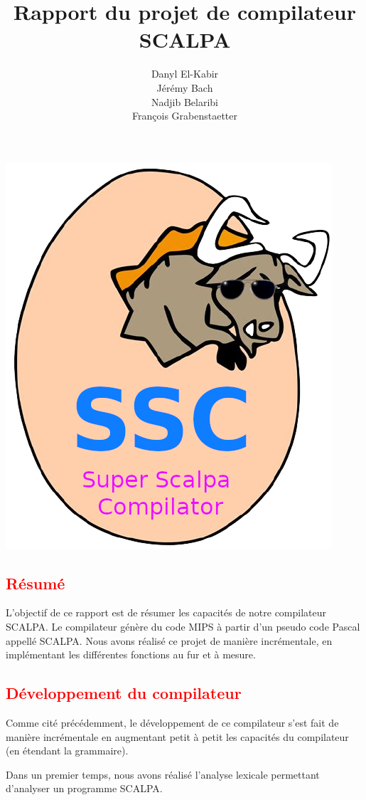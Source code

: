 \documentclass[a4paper]{article}
\title{Rapport du projet de compilateur SCALPA}
\author{Danyl El-Kabir\\Jérémy Bach\\Nadjib Belaribi\\François Grabenstaetter}
\newcommand{\csection}[1]{\textcolor{red}{\section{#1}}}
\begin{document}
\sffamily
\everymath{\displaystyle}
\setlength\parindent{0mm}
\setlength{\parskip}{0.2cm}
\maketitle

\begin{center}
    \includegraphics[scale=0.8]{img/scalpa.png}
\end{center}

\newpage
\tableofcontents
\newpage

\csection{Résumé}

L'objectif de ce rapport est de résumer les capacités de notre compilateur SCALPA. Le compilateur génère du code MIPS à partir d'un pseudo code Pascal appellé SCALPA. Nous avons réalisé ce projet de manière incrémentale, en implémentant les différentes fonctions au fur et à mesure.

\csection{Développement du compilateur}

Comme cité précédemment, le développement de ce compilateur s'est fait de manière incrémentale en augmentant petit à petit les capacités du compilateur (en étendant la grammaire).

Dans un premier temps, nous avons réalisé l'analyse lexicale permettant d'analyser un programme SCALPA.
\end{document}
